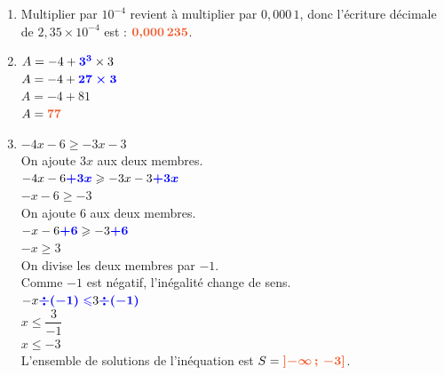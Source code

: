 \documentclass[a4paper,11pt]{article}
\begin{document}
\begin{seanceD}{}
\begin{enumerate}
\begin{tikzpicture}[baseline,scale = 0.75]
\end{tikzpicture}


\item  Multiplier par  $10^{-4}$ revient à multiplier par $0{,}000\,1$,  donc l'écriture décimale de $2{,}35\times 10^{-4}$ est : ${\color[HTML]{f15929}\boldsymbol{0{,}000\,235}}$.


\item  $A          =-4 + {\color{blue}\boldsymbol{3^3}} \times 3$\\$A=-4 + {\color{blue}\boldsymbol{27\times3}}$\\$A=-4+81$\\$A = {\color[HTML]{f15929}\boldsymbol{77}}$


\item 
 $-4x-6\geqslant -3x-3$\\On ajoute $3x$ aux deux membres.\\$-4x-6{\color{blue}\boldsymbol{+3x}}
          \geqslant-3x-3{\color{blue}\boldsymbol{+3x}}$\\$-x-6\geqslant-3$\\On ajoute $6$ aux deux membres.\\$-x-6{\color{blue}\boldsymbol{+6}}
          \geqslant-3{\color{blue}\boldsymbol{+6}}$\\$-x\geqslant3$\\On divise les deux membres par $-1$.\\Comme $-1$ est négatif, l'inégalité change de sens.\\$-x{\color{blue}\boldsymbol{\div(-1)\leqslant}}3{\color{blue}\boldsymbol{\div(-1)}}$\\$x\leqslant\dfrac{3}{-1}$\\$x\leqslant-3$\\ L'ensemble de solutions de l'inéquation est $S = {\color[HTML]{f15929}\boldsymbol{\left] -\infty\,;\,-3\right]}}$.

\end{enumerate}
\end{seanceD}
\end{document}
